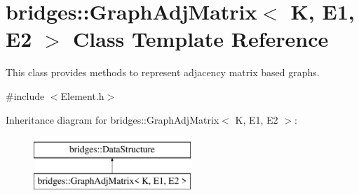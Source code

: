 \hypertarget{classbridges_1_1_graph_adj_matrix}{}\section{bridges\+::Graph\+Adj\+Matrix$<$ K, E1, E2 $>$ Class Template Reference}
\label{classbridges_1_1_graph_adj_matrix}


This class provides methods to represent adjacency matrix based graphs.  




{\ttfamily \#include $<$Element.\+h$>$}

Inheritance diagram for bridges\+::Graph\+Adj\+Matrix$<$ K, E1, E2 $>$\+:\begin{figure}[H]
\begin{center}
\leavevmode
\includegraphics[height=2.000000cm]{classbridges_1_1_graph_adj_matrix}
\end{center}
\end{figure}
